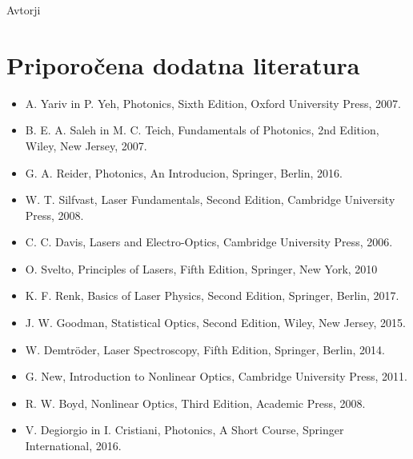 \documentclass[11pt,fleqn]{book} %
\begin{document}
\vspace{1em}

 Avtorji





\chapter*{Priporočena dodatna literatura}

\begin{itemize}
\setlength\itemsep{0.5em}
 \item A. Yariv in P. Yeh, Photonics, Sixth Edition, Oxford University Press, 2007.
 \item B. E. A. Saleh in M. C. Teich, Fundamentals of Photonics, 2nd Edition, Wiley, New Jersey, 2007. 
 \item G. A. Reider, Photonics, An Introducion, Springer, Berlin, 2016.
 \item W. T. Silfvast, Laser Fundamentals, Second Edition, Cambridge University Press, 2008. 
 \item C. C. Davis, Lasers and Electro-Optics, Cambridge University Press, 2006.
 \item O. Svelto, Principles of Lasers, Fifth Edition, Springer, New York, 2010
 \item K. F. Renk, Basics of Laser Physics, Second Edition, Springer, Berlin, 2017.
 \item J. W. Goodman, Statistical Optics, Second Edition, Wiley, New Jersey, 2015.
 \item W. Demtr\"oder, Laser Spectroscopy, Fifth Edition, Springer, Berlin, 2014.
 \item G. New, Introduction to Nonlinear Optics, Cambridge University Press, 2011.
 \item R. W. Boyd, Nonlinear Optics, Third Edition, Academic Press, 2008.
 \item V. Degiorgio in I. Cristiani, Photonics, A Short Course, Springer International, 2016.
\end{itemize}

\end{document}
